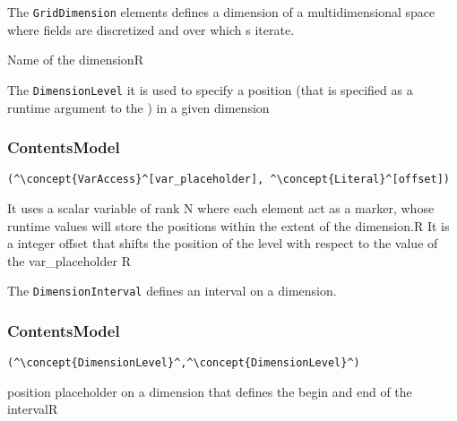 
The {\tt GridDimension} elements defines a dimension of a multidimensional space where fields are discretized and over which s iterate.

\HIRContentsModel{ () }
\begin{HIRAttributes}
	{Name of the dimension}{R}
\end{HIRAttributes}


The {\tt DimensionLevel} it is used to specify a position (that is specified as a runtime argument to the ) in a given dimension

\subsubsection*{ContentsModel}{}

\begin{lstlisting}[style=default]
(^\concept{VarAccess}^[var_placeholder], ^\concept{Literal}^[offset])
\end{lstlisting}

\begin{HIRChildElements}
	{It uses a scalar variable of rank N where each element act as a marker, whose runtime values will store the positions within the extent of the dimension.}{R}
	{It is a integer offset that shifts the position of the level with respect to the value of the var\_placeholder }{R}
\end{HIRChildElements}


The {\tt DimensionInterval} defines an interval on a dimension.

\subsubsection*{ContentsModel}{}

\begin{lstlisting}[style=default]
(^\concept{DimensionLevel}^,^\concept{DimensionLevel}^)
\end{lstlisting}

\begin{HIRChildElements}
	{position placeholder on a dimension that defines the begin and end of the interval}{R}
\end{HIRChildElements}

